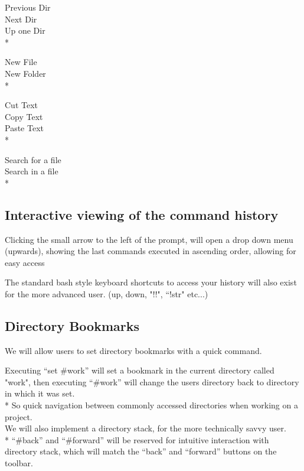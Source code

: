 \documentclass[a4paper,12pt]{article}
\begin{document}
\begin{multicols}{4}\noindent
Previous Dir \\ %
Next Dir \\ %
Up one Dir \\*%
\columnbreak

\noindent
New File \\ %
New Folder \\*%
\columnbreak

\noindent
Cut Text \\ %
Copy Text \\ %
Paste Text \\*%
\columnbreak

\noindent
Search for a file \\ %
Search in a file \\*%
\end{multicols}

\subsection*{Interactive viewing of the command history}
Clicking the small arrow to the left of the prompt, will open a drop down menu (upwards), showing the last commands executed in ascending order, allowing for easy access

The standard bash style keyboard shortcuts to access your history will also exist for the
more advanced user. (up, down, "!!", ``!str" etc...)

\subsection*{Directory Bookmarks}
We will allow users to set directory bookmarks with a quick command.

Executing ``set \#work'' will set a bookmark in the current directory called "work", then executing ``\#work'' will change the users directory back to directory in which it was set.\\*
So quick navigation between commonly accessed directories when working on a project.\\[0.5cm]
We will also implement a directory stack, for the more technically savvy user.\\*
``\#back'' and ``\#forward'' will be reserved for intuitive interaction with  directory stack, which will match the ``back'' and ``forward'' buttons on the toolbar.
\end{document}
